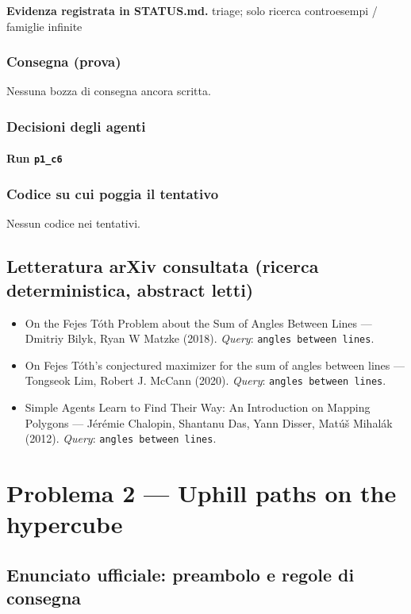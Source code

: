 \documentclass[11pt,a4paper]{article}
\begin{document}
\textbf{Evidenza registrata in STATUS.md.} triage; solo ricerca controesempi / famiglie infinite

\subsubsection{Consegna (prova)}
Nessuna bozza di consegna ancora scritta.

\subsubsection{Decisioni degli agenti}
\paragraph{Run \texttt{p1\_c6}}

\subsubsection{Codice su cui poggia il tentativo}
Nessun codice nei tentativi.

\subsection{Letteratura arXiv consultata (ricerca deterministica, abstract letti)}
\begin{itemize}
\item \cite{1801.07837v1} On the Fejes Tóth Problem about the Sum of Angles Between Lines — Dmitriy Bilyk, Ryan W Matzke (2018). \emph{Query}: \texttt{angles between lines}.
\item \cite{2007.08698v2} On Fejes Tóth's conjectured maximizer for the sum of angles between lines — Tongseok Lim, Robert J. McCann (2020). \emph{Query}: \texttt{angles between lines}.
\item \cite{1204.3850v1} Simple Agents Learn to Find Their Way: An Introduction on Mapping Polygons — Jérémie Chalopin, Shantanu Das, Yann Disser, Matúš Mihalák (2012). \emph{Query}: \texttt{angles between lines}.
\end{itemize}
\section{Problema 2 — Uphill paths on the hypercube}
\subsection{Enunciato ufficiale: preambolo e regole di consegna}
\end{document}
